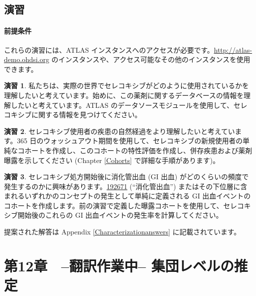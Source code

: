 \documentclass[
  11pt]{book}
\theoremstyle{definition}
\theoremstyle{definition}
\theoremstyle{definition}
\newtheorem{exercise}{演習}[chapter]
\theoremstyle{definition}
\theoremstyle{remark}
\begin{document}
\section{演習}\label{ux6f14ux7fd2-6}

\subsubsection*{前提条件}\label{ux524dux63d0ux6761ux4ef6-6}

これらの演習には、ATLAS インスタンスへのアクセスが必要です。\url{http://atlas-demo.ohdsi.org} のインスタンスや、アクセス可能なその他のインスタンスを使用できます。

\begin{exercise}
\protect\hypertarget{exr:exerciseCharacterization1}{}\label{exr:exerciseCharacterization1}私たちは、実際の世界でセレコキシブがどのように使用されているかを理解したいと考えています。始めに、この薬剤に関するデータベースの情報を理解したいと考えています。ATLAS のデータソースモジュールを使用して、セレコキシブに関する情報を見つけてください。
\end{exercise}

\begin{exercise}
\protect\hypertarget{exr:exerciseCharacterization2}{}\label{exr:exerciseCharacterization2}セレコキシブ使用者の疾患の自然経過をより理解したいと考えています。365 日のウォッシュアウト期間を使用して、セレコキシブの新規使用者の単純なコホートを作成し、このコホートの特性評価を作成し、併存疾患および薬剤曝露を示してください (Chapter \ref{Cohorts} で詳細な手順があります)。
\end{exercise}

\begin{exercise}
\protect\hypertarget{exr:exerciseCharacterization3}{}\label{exr:exerciseCharacterization3}セレコキシブ処方開始後に消化管出血 (GI 出血) がどのくらいの頻度で発生するのかに興味があります。\href{http://athena.ohdsi.org/search-terms/terms/192671}{192671} (``消化管出血'') またはその下位層に含まれるいずれかのコンセプトの発生として単純に定義される GI 出血イベントのコホートを作成します。前の演習で定義した曝露コホートを使用して、セレコキシブ開始後のこれらの GI 出血イベントの発生率を計算してください。
\end{exercise}

提案された解答は Appendix \ref{Characterizationanswers} に記載されています。

\chapter{第12章　--翻訳作業中-- 集団レベルの推定}\label{PopulationLevelEstimation}
\end{document}
